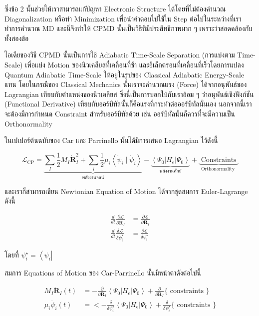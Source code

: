 \noindent ซึ่งข้อ 2 นั้นช่วยให้เราสามารถแก้ปัญหา Electronic Structure ได้โดยที่ไม่ต้องคำนวณ Diagonalization หรือทำ Minimization
เพื่อนำคำตอบไปใช้ใน Step ต่อไปในระหว่างที่เราทำการคำนวณ MD และนี่จึงทำให้ CPMD นั้นเป็นวิธีที่มีประสิทธิภาพมาก ๆ เพราะว่าสอดคล้องกับทั้งสองข้อ

ไอเดียของวิธี CPMD นั้นเป็นการใช้ Adiabatic Time-Scale Separation (การแบ่งตาม Time-Scale) เพื่อแบ่ง Motion ของนิวเคลียสที่เคลื่อนที่ช้า
และอิเล็กตรอนที่เคลื่อนที่เร็วโดยการแปลง Quantum Adiabatic Time-Scale ให้อยู่ในรูปของ Classical Adiabatic Energy-Scale แทน
โดยในกรณีของ Classical Mechanics นั้นเราจะคำนวณแรง (Force) ได้จากอนุพันธ์ของ Lagrangian เทียบกับตำแหน่งของนิวเคลียส
ซึ่งนี่เป็นการบอกใบ้กับเราอ้อม ๆ ว่าอนุพันธ์เชิงฟังก์ชัน (Functional Derivative) เทียบกับออร์บิทัลนั้นก็คือแรงที่กระทำต่อออร์บิทัลนั่นเอง
นอกจากนี้เราจะต้องมีการกำหนด Constraint สำหรับออร์บิทัลด้วย เช่น ออร์บิทัลนั้นก็ควรที่จะมีความเป็น Orthonormality

ในเปเปอร์ต้นฉบับของ Car และ Parrinello นั้นได้มีการเสนอ Lagrangian ไว้ดังนี้

\begin{equation}
  \mathcal{L}_{\mathrm{CP}}
  =
  \underbrace{\sum_I \frac{1}{2} M_I \dot{\mathbf{R}}_I^2
    +\sum_i \frac{1}{2} \mu_i\left\langle\dot{\psi}_i \mid \dot{\psi}_i\right\rangle}_{\text{พลังงานจลน์}}
  -\underbrace{\left\langle\Psi_0\left| H_{\mathrm{e}}\right| \Psi_0\right\rangle}_{\text{พลังงานศักย์}}
  +\underbrace{\text{ Constraints }}_{\text{Orthonormality }}
\end{equation}

\noindent และเราก็สามารถเขียน Newtonian Equation of Motion ได้จากชุดสมการ Euler-Lagrange ดังนี้


\begin{align}
  \frac{d}{d t} \frac{\partial \mathcal{L}}{\partial \dot{\mathbf{R}}_I}
   & =
  \frac{\partial \mathcal{L}}{\partial \mathbf{R}_I} \\
  \frac{d}{d t} \frac{\delta \mathcal{L}}{\delta \dot{\psi}_i^{\star}}
   & =
  \frac{\delta \mathcal{L}}{\delta \psi_i^{\star}}
\end{align}

\noindent โดยที่ $\psi_i^{\star}=\left\langle\psi_i\right|$

สมการ Equations of Motion ของ Car-Parrinello นั้นมีหน้าตาดังต่อไปนี้


\begin{align}
  M_I \ddot{\mathbf{R}}_I(t)
   & =
  -\frac{\partial}{\partial \mathbf{R}_I}\left\langle\Psi_0\left| H_{\mathrm{e}}\right| \Psi_0\right\rangle
  +\frac{\partial}{\partial \mathbf{R}_I}\{\text{ constraints }\} \\
  \mu_i \ddot{\psi}_i(t)
   & =
  <-\frac{\delta}{\delta \psi_i^{\star}}\left\langle\Psi_0\left| H_{\mathrm{e}}\right| \Psi_0\right\rangle
  +\frac{\delta}{\delta \psi_i^{\star}}\{\text{ constraints }\}
\end{align}


